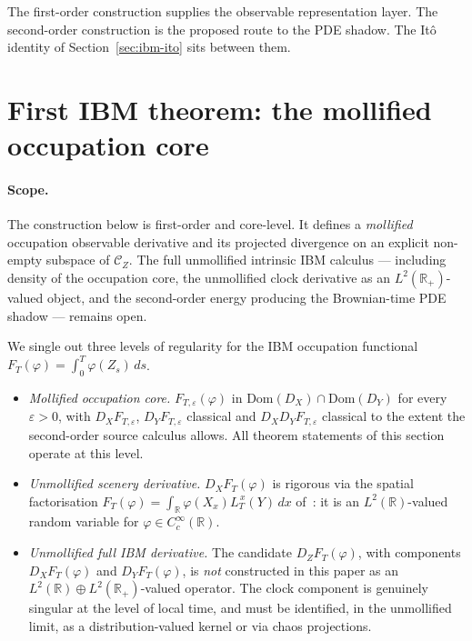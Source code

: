 \documentclass[11pt,reqno]{amsart}
\theoremstyle{plain}
\theoremstyle{definition}
\theoremstyle{remark}
\newcommand{\R}{\mathbb{R}}
\newcommand{\Dom}{\mathrm{Dom}}
\newcommand{\IBM}{Z}
\begin{document}
The first-order construction supplies the observable representation
layer. The second-order construction is the proposed route to the PDE
shadow. The It\^o identity of Section~\ref{sec:ibm-ito} sits between
them.

\section{First IBM theorem: the mollified occupation core}\label{sec:ibm-occ}

\paragraph{Scope.} The construction below is first-order and
core-level. It defines a \emph{mollified} occupation observable
derivative and its projected divergence on an explicit non-empty
subspace of $\mathcal C_\IBM$. The full unmollified intrinsic IBM
calculus --- including density of the occupation core, the unmollified
clock derivative as an $L^{2}(\R_{+})$-valued object, and the
second-order energy producing the Brownian-time PDE shadow --- remains
open.

We single out three levels of regularity for the IBM occupation
functional $F_T(\varphi)=\int_0^T\varphi(\IBM_s)\,ds$.

\begin{itemize}
\item[(A)] \emph{Mollified occupation core.}
  $F_{T,\varepsilon}(\varphi)$ in $\Dom(D_X)\cap\Dom(D_Y)$ for every
  $\varepsilon>0$, with $D_X F_{T,\varepsilon}$,
  $D_Y F_{T,\varepsilon}$ classical and
  $D_X D_Y F_{T,\varepsilon}$ classical to the extent the
  second-order source calculus allows. All theorem statements of
  this section operate at this level.
\item[(B)] \emph{Unmollified scenery derivative.}
  $D_X F_T(\varphi)$ is rigorous via the spatial factorisation
  $F_T(\varphi)=\int_{\R}\varphi(X_x)L_T^{\,x}(Y)\,dx$
  of~\cite{Fontes-IBMchaos}: it is an $L^{2}(\R)$-valued random
  variable for $\varphi\in C_c^\infty(\R)$.
\item[(C)] \emph{Unmollified full IBM derivative.} The candidate
  $D_\IBM F_T(\varphi)$, with components $D_X F_T(\varphi)$ and
  $D_Y F_T(\varphi)$, is \emph{not} constructed in this paper as an
  $L^{2}(\R)\oplus L^{2}(\R_{+})$-valued operator. The clock
  component is genuinely singular at the level of local time, and
  must be identified, in the unmollified limit, as a
  distribution-valued kernel or via chaos projections.
\end{itemize}
\end{document}
